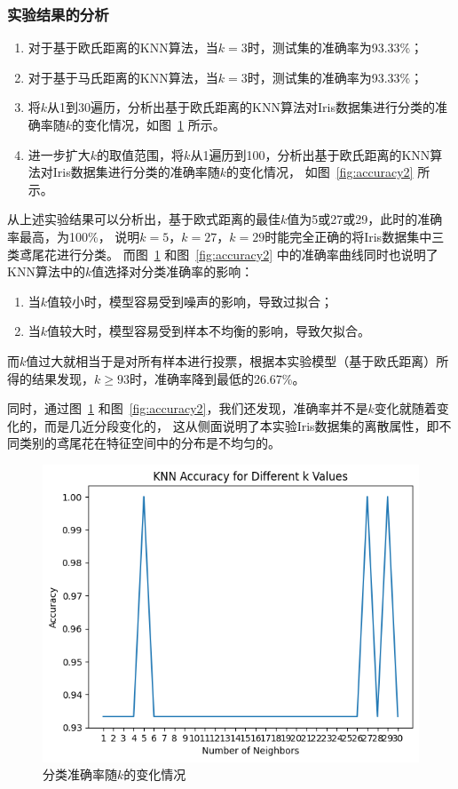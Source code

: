 \documentclass[12pt]{article}
\begin{document}
\subsubsection{实验结果的分析}

\begin{enumerate}
  \item 对于基于欧氏距离的KNN算法，当$k=3$时，测试集的准确率为93.33\%；
  \item 对于基于马氏距离的KNN算法，当$k=3$时，测试集的准确率为93.33\%；
  \item 将$k$从1到30遍历，分析出基于欧氏距离的KNN算法对Iris数据集进行分类的准确率随$k$的变化情况，如图~\ref{fig:accuracy} 所示。
  \item 进一步扩大$k$的取值范围，将$k$从1遍历到100，分析出基于欧氏距离的KNN算法对Iris数据集进行分类的准确率随$k$的变化情况，
        如图~\ref{fig:accuracy2} 所示。
\end{enumerate}
从上述实验结果可以分析出，基于欧式距离的最佳$k$值为5或27或29，此时的准确率最高，为100\%，
说明$k=5$，$k=27$，$k=29$时能完全正确的将Iris数据集中三类鸢尾花进行分类。
而图~\ref{fig:accuracy} 和图~\ref{fig:accuracy2} 中的准确率曲线同时也说明了KNN算法中的$k$值选择对分类准确率的影响：
\begin{enumerate}
  \item 当$k$值较小时，模型容易受到噪声的影响，导致过拟合；
  \item 当$k$值较大时，模型容易受到样本不均衡的影响，导致欠拟合。
\end{enumerate}
而$k$值过大就相当于是对所有样本进行投票，根据本实验模型（基于欧氏距离）所得的结果发现，$k \geq 93$时，准确率降到最低的26.67\%。

同时，通过图~\ref{fig:accuracy} 和图~\ref{fig:accuracy2}，我们还发现，准确率并不是$k$变化就随着变化的，而是几近分段变化的，
这从侧面说明了本实验Iris数据集的离散属性，即不同类别的鸢尾花在特征空间中的分布是不均匀的。

\begin{figure}[htbp]
  \centering
  \includegraphics[scale=0.8]{figures/knn/accuracy.png}
  \caption{分类准确率随$k$的变化情况}
  \label{fig:accuracy}
\end{figure}
\end{document}

